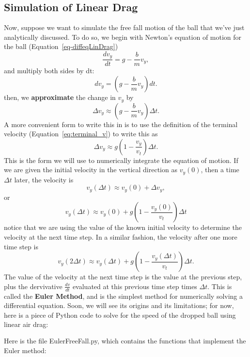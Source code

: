 \subsection{Simulation of Linear Drag}
\label{sec-LinDragSimulation}
Now, suppose we want to simulate the free fall motion of the ball that we've just analytically discussed. To do so, we begin with Newton's equation of motion for the ball (Equation~\ref{eq-diffeqLinDrag}) 
\begin{equation}
	\frac{d v_y}{dt} = g - \frac{b}{m} v_y,
	\label{eq-diffeqEuler}
\end{equation}
and multiply both sides by dt:
$$ d v_y = \left(g - \frac{b}{m} v_y\right) dt.$$
then, we \textbf{approximate} the change in $v_y$ by 
$$\Delta v_y \approx \left(g - \frac{b}{m} v_y\right) \Delta t.$$
A more convenient form to write this in is to use the definition of the terminal velocity (Equation~\ref{eq:terminal_v}) to write this as
\begin{equation}
	 \Delta v_y \approx g\left(1 - \frac{v_y}{v_t}\right) \Delta t.
\end{equation}
This is the form we will use to numerically integrate the equation of motion.
If we are given the initial velocity in the vertical direction as $v_{y}(0)$, then a time $\Delta t$ later, the velocity is 
$$v_y(\Delta t) \approx v_{y}(0)+ \Delta v_y,$$
or 
$$v_y(\Delta t) \approx v_{y}(0) + g\left(1 - \frac{v_{y}(0)}{v_t}\right) \Delta t $$
notice that we are using the value of the known initial velocity to determine the velocity at the next time step. In a similar fashion, the velocity after one more time step is 
$$v_y(2\Delta t) \approx v_{y}(\Delta t) + g\left(1 - \frac{v_{y}(\Delta t)}{v_t}\right) \Delta t. $$
The value of the velocity at the next time step is the value at the previous step, plus the dervivative $\frac{dv}{dt}$ evaluated at this previous time step times $\Delta t$. This is called the \textbf{Euler Method}, and is the simplest method for numerically solving a differential equation. Soon, we will see its origins and its limitations; for now, here is a piece of Python code to solve for the speed of the dropped ball using linear air drag:
\pagebreak


Here is the file EulerFreeFall.py, which contains the functions that implement the Euler method:


